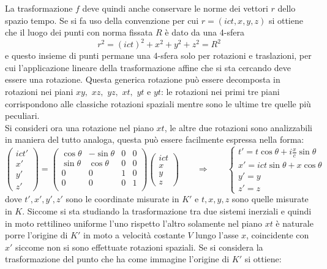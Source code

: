 La trasformazione $f$ deve quindi anche conservare le norme dei vettori $r$ dello spazio tempo. Se si fa uso della convenzione per cui $r=(ict,x,y,z)$ si ottiene che il luogo dei punti con norma fissata $R$ è dato da una 4-sfera
\begin{equation}
    r^2=(ict)^2+x^2+y^2+z^2=R^2
    \label{4-sfera}
\end{equation} 
e questo insieme di punti permane una 4-sfera solo per rotazioni e traslazioni, per cui l'applicazione lineare della trasformazione affine che si sta cercando deve essere una rotazione. Questa generica rotazione può essere decomposta in rotazioni nei piani $xy,$ $xz,$ $yz,$ $xt,$ $yt$ e $yt$: le rotazioni nei primi tre piani corrispondono alle classiche rotazioni spaziali mentre sono le ultime tre quelle più peculiari.\\ Si consideri ora una rotazione nel piano $xt$, le altre due rotazioni sono analizzabili in maniera del tutto analoga, questa può essere facilmente espressa nella forma:
\begin{equation*}
   \begin{pmatrix}
    ict'\\x'\\y'\\z'
   \end{pmatrix}
   =\begin{pmatrix}
    \cos\theta & -\sin\theta & 0 & 0\\
    \sin\theta & \cos\theta & 0 & 0\\
    0& 0 & 1 & 0\\
    0& 0 & 0 & 1\\
   \end{pmatrix}
   \begin{pmatrix}
    ict\\x\\y\\z
   \end{pmatrix}\qquad
   \Rightarrow \qquad
   \begin{cases}
    t'=t\cos\theta+i\frac{x}{c}\sin\theta\\
    x'=ict\sin\theta+x\cos\theta\\
    y'=y\\
    z'=z
   \end{cases}
\end{equation*}
dove $t',x',y',z'$ sono le coordinate misurate in $K'$ e $t,x,y,z$ sono quelle misurate in $K$. Siccome si sta studiando la trasformazione tra due sistemi inerziali e quindi in moto rettilineo uniforme l'uno rispetto l'altro solamente nel piano $xt$ è naturale porre l'origine di $K'$ in moto a velocità costante $V$ lungo l'asse $x$, coincidente con $x'$ siccome non si sono effettuate rotazioni spaziali. Se si considera la trasformazione del punto che ha come immagine l'origine di $K'$ si ottiene:
